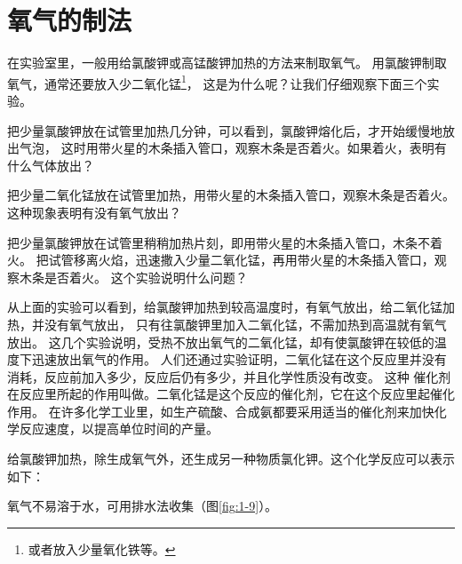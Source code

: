 \section{氧气的制法}\label{sec:1-3}

在实验室里，一般用给氯酸钾或高锰酸钾加热的方法来制取氧气。
用氯酸钾制取氧气，通常还要放入少二氧化锰\footnote{或者放入少量氧化铁等。}，
这是为什么呢？让我们仔细观察下面三个实验。

\begin{shiyan}
    把少量氯酸钾放在试管里加热几分钟，可以看到，氯酸钾熔化后，才开始缓慢地放出气泡，
    这时用带火星的木条插入管口，观察木条是否着火。如果着火，表明有什么气体放出？
\end{shiyan}

\begin{shiyan}
    把少量二氧化锰放在试管里加热，用带火星的木条插入管口，观察木条是否着火。
    这种现象表明有没有氧气放出？
\end{shiyan}

\begin{shiyan}
    把少量氯酸钾放在试管里稍稍加热片刻，即用带火星的木条插入管口，木条不着火。
    把试管移离火焰，迅速撒入少量二氧化锰，再用带火星的木条插入管口，观察木条是否着火。
    这个实验说明什么问题？
\end{shiyan}


从上面的实验可以看到，给氯酸钾加热到较高温度时，有氧气放出，给二氧化锰加热，并没有氧气放出，
只有往氯酸钾里加入二氧化锰，不需加热到高温就有氧气放出。
这几个实验说明，受热不放出氧气的二氧化锰，却有使氯酸钾在较低的温度下迅速放出氧气的作用。
人们还通过实验证明，二氧化锰在这个反应里并没有消耗，反应前加入多少，反应后仍有多少，并且化学性质没有改变。
这种
催化剂在反应里所起的作用叫做。二氧化锰是这个反应的催化剂，它在这个反应里起催化作用。
在许多化学工业里，如生产硫酸、合成氨都要采用适当的催化剂来加快化学反应速度，以提高单位时间的产量。

给氯酸钾加热，除生成氧气外，还生成另一种物质氯化钾。这个化学反应可以表示如下：
\begin{fangchengshi}
\end{fangchengshi}

氧气不易溶于水，可用排水法收集（图\ref{fig:1-9}）。

